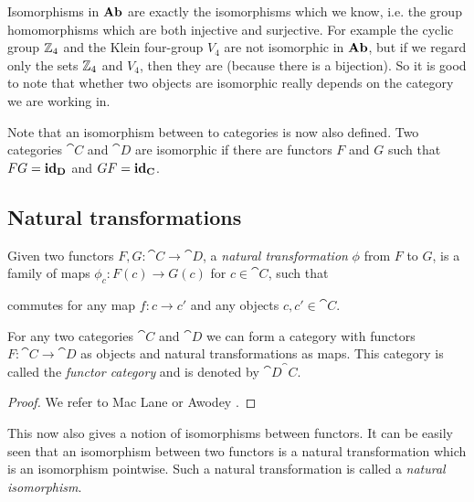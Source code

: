 Isomorphisms in $\mathbf{Ab}$ are exactly the isomorphisms which we know, i.e. the group homomorphisms which are both injective and surjective.
For example the cyclic group $\mathbb{Z}_4$ and the Klein four-group $V_4$ are not isomorphic in $\mathbf{Ab}$, but if we regard only the sets $\mathbb{Z}_4$ and $V_4$, then they are (because there is a bijection). So it is good to note that whether two objects are isomorphic  really depends on the category we are working in.

Note that an isomorphism between to categories is now also defined. Two categories $\cat{C}$ and $\cat{D}$ are isomorphic if there are functors $F$ and $G$ such that $ FG = \mathbf{id}_{\mathbf{D}}$ and $GF = \mathbf{id}_{\mathbf{C}}$.

\subsection{Natural transformations}

\begin{definition}
	Given two functors $F, G: \cat{C} \to \cat{D}$, a \emph{natural transformation} $\phi$ from $F$ to $G$, is a family of maps $\phi_c : F(c) \to G(c)$ for $c \in \cat{C}$, such that
	\begin{center}
	\end{center}
	commutes for any map $f: c \to c'$ and any objects $c, c' \in \cat{C}$.
\end{definition}

\begin{lemma}
	For any two categories $\cat{C}$ and $\cat{D}$ we can form a category with functors $F: \cat{C} \to \cat{D}$ as objects and natural transformations as maps. This category is called the \emph{functor category} and is denoted by $\cat{D}^\cat{C}$.
\end{lemma}
\begin{proof}
	We refer to Mac Lane \cite{maclane} or Awodey \cite{awodey}.
\end{proof}

This now also gives a notion of isomorphisms between functors. It can be easily seen that an isomorphism between two functors is a natural transformation which is an isomorphism pointwise. Such a natural transformation is called a \emph{natural isomorphism}.

